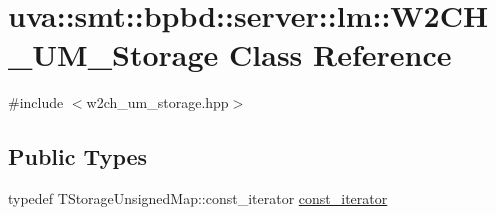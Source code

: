 \hypertarget{classuva_1_1smt_1_1bpbd_1_1server_1_1lm_1_1_w2_c_h___u_m___storage}{}\section{uva\+:\+:smt\+:\+:bpbd\+:\+:server\+:\+:lm\+:\+:W2\+C\+H\+\_\+\+U\+M\+\_\+\+Storage Class Reference}
\label{classuva_1_1smt_1_1bpbd_1_1server_1_1lm_1_1_w2_c_h___u_m___storage}


{\ttfamily \#include $<$w2ch\+\_\+um\+\_\+storage.\+hpp$>$}

\subsection*{Public Types}
\begin{DoxyCompactItemize}
\item 
typedef T\+Storage\+Unsigned\+Map\+::const\+\_\+iterator \hyperlink{classuva_1_1smt_1_1bpbd_1_1server_1_1lm_1_1_w2_c_h___u_m___storage_a6e139aac86ba5aae8b4288d5e112baec}{const\+\_\+iterator}
\end{DoxyCompactItemize}
